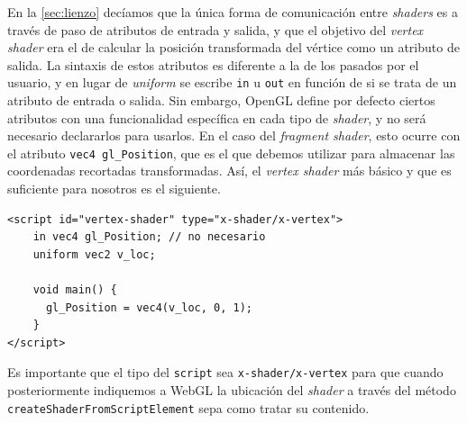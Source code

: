 En la \autoref{sec:lienzo} decíamos que la única forma de comunicación entre \textit{shaders} es a través de paso de atributos de entrada y salida, y que el objetivo del \textit{vertex shader} era el de calcular la posición transformada del vértice como un atributo de salida. La sintaxis de estos atributos es diferente a la de los pasados por el usuario, y en lugar de \textit{uniform} se escribe \texttt{in} u \texttt{out} en función de si se trata de un atributo de entrada o salida. Sin embargo, OpenGL define por defecto ciertos atributos con una funcionalidad específica en cada tipo de \textit{shader}, y no será necesario declararlos para usarlos. En el caso del \textit{fragment shader}, esto ocurre con el atributo \texttt{vec4 gl\_Position}, que es el que debemos utilizar para almacenar las coordenadas recortadas transformadas. Así, el \textit{vertex shader} más básico y que es suficiente para nosotros es el siguiente.
\begin{lstlisting}
<script id="vertex-shader" type="x-shader/x-vertex">
    in vec4 gl_Position; // no necesario
    uniform vec2 v_loc;
    
    void main() {
      gl_Position = vec4(v_loc, 0, 1);
    }
</script>
\end{lstlisting}
Es importante que el tipo del \texttt{script} sea \texttt{x-shader/x-vertex} para que cuando posteriormente indiquemos a WebGL la ubicación del \textit{shader} a través del método \texttt{createShaderFromScriptElement} sepa como tratar su contenido.\newline

